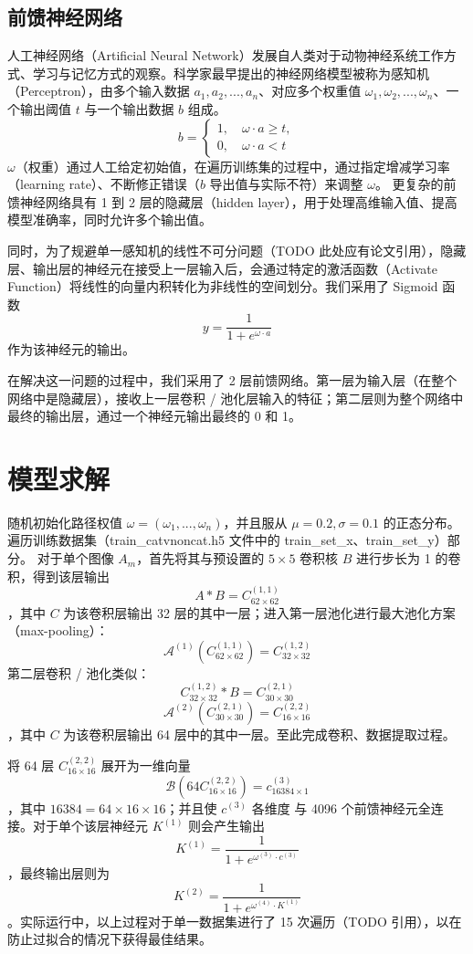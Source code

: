 \documentclass[UTF8]{ctexart}
\begin{document}
\subsection{前馈神经网络}
人工神经网络（Artificial Neural Network）发展自人类对于动物神经系统工作方式、学习与记忆方式的观察。科学家最早提出的神经网络模型被称为感知机（Perceptron），由多个输入数据 $a_1, a_2, ..., a_n$、对应多个权重值 $\omega_1, \omega_2, ..., \omega_n$、一个输出阈值 $t$ 与一个输出数据 $b$ 组成。
$$
b = 
\left\{
\begin{aligned}
1, \quad \omega \cdot a \geqslant t,\\
0, \quad \omega \cdot a < t
\end{aligned}
\right.
$$
$\omega$（权重）通过人工给定初始值，在遍历训练集的过程中，通过指定增减学习率（learning rate）、不断修正错误（$b$ 导出值与实际不符）来调整 $\omega$。
更复杂的前馈神经网络具有 1 到 2 层的隐藏层（hidden layer），用于处理高维输入值、提高模型准确率，同时允许多个输出值。

同时，为了规避单一感知机的线性不可分问题（TODO 此处应有论文引用），隐藏层、输出层的神经元在接受上一层输入后，会通过特定的激活函数（Activate Function）将线性的向量内积转化为非线性的空间划分。我们采用了 Sigmoid 函数
$$y = \frac{1}{1 + e^{\omega \cdot a}}$$
作为该神经元的输出。

在解决这一问题的过程中，我们采用了 2 层前馈网络。第一层为输入层（在整个网络中是隐藏层），接收上一层卷积 / 池化层输入的特征；第二层则为整个网络中最终的输出层，通过一个神经元输出最终的 0 和 1。

\section{模型求解}
随机初始化路径权值 $\omega = (\omega_1, ..., \omega_n)$，并且服从 $\mu = 0.2, \sigma = 0.1$ 的正态分布。
遍历训练数据集（train\_catvnoncat.h5 文件中的 train\_set\_x、train\_set\_y）部分。
对于单个图像 $A_m$，首先将其与预设置的 $5 \times 5$ 卷积核 $B$ 进行步长为 1 的卷积，得到该层输出
$$A * B = C^{(1,1)}_{62 \times 62}$$
，其中 $C$ 为该卷积层输出 32 层的其中一层；进入第一层池化进行最大池化方案（max-pooling）：
$$\mathcal{A}^{(1)}(C^{(1,1)}_{62 \times 62}) = C^{(1,2)}_{32 \times 32}$$
第二层卷积 / 池化类似：
$$C^{(1,2)}_{32 \times 32} * B = C^{(2,1)}_{30 \times 30}$$
$$\mathcal{A}^{(2)}(C^{(2,1)}_{30 \times 30}) = C^{(2,2)}_{16 \times 16}$$
，其中 $C$ 为该卷积层输出 64 层中的其中一层。至此完成卷积、数据提取过程。

将 64 层 $C^{(2,2)}_{16 \times 16}$ 展开为一维向量
$$\mathcal{B}(64C^{(2,2)}_{16 \times 16}) = c^{(3)}_{16384 \times 1}$$
，其中 $16384 = 64 \times 16 \times 16$；并且使 $c^{(3)}$ 各维度 与 4096 个前馈神经元全连接。对于单个该层神经元 $K^{(1)}$ 则会产生输出
$$K^{(1)} = \frac{1}{1 + e^{\omega^{(3)} \cdot c^{(3)}}}$$
，最终输出层则为
$$K^{(2)} = \frac{1}{1 + e^{\omega^{(4)} \cdot K^{(1)}}}$$
。实际运行中，以上过程对于单一数据集进行了 15 次遍历（TODO 引用），以在防止过拟合的情况下获得最佳结果。
\end{document}

